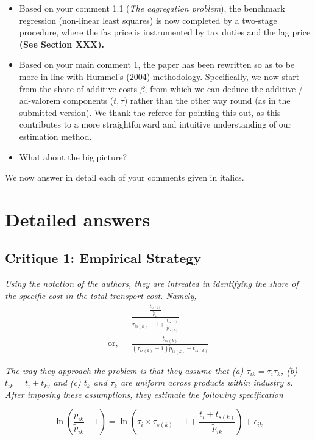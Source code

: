 \documentclass[a4paper,12pt]{article}
\begin{document}
\begin{itemize}
\item Based on your comment 1.1 (\textit{The aggregation problem}), the benchmark regression (non-linear least squares) is now completed by a two-stage procedure, where the fas price is instrumented by tax duties and the lag price \textbf{(See Section XXX).}

\item Based on your main comment 1, the paper has been rewritten so as to be more in line with Hummel's (2004) methodology. Specifically, we now start from the share of additive costs $\beta$, from which we can deduce the additive / ad-valorem components ($t,\tau$) rather than the other way round (as in the submitted version). We thank the referee for pointing this out, as this contributes to a more straightforward and intuitive understanding of our estimation method.

\item What about the big picture?
\end{itemize}

We now answer in detail each of your comments given in italics.

\section{Detailed answers \label{sec:detailed_answers}}
\subsection{Critique 1: Empirical Strategy}

\textit{Using the notation of the authors, they are intreated
in identifying the share of the specific cost in the total transport cost. Namely,}
\begin{eqnarray*}
&& \frac{\frac{t_{is(k)}}{\tilde{p}_{ik}}}{\tau_{is(k)}-1 + \frac{t_{is(k)}}{\tilde{p}_{is(k)}}} \\
\text{or,} &&\frac{t_{is(k)}}{(\tau_{is(k)}-1)\tilde{p}_{is(k)} + t_{is(k)}}
\end{eqnarray*}

\textit{The way they approach the problem is that they assume that (a) $\tau_{ik} = \tau_i\tau_{k}$,
(b) $t_{ik} = t_i +t_k$, and (c) $t_k$ and $\tau_k$ are uniform across products within industry
s. After imposing these assumptions, they estimate the following specification}

\begin{equation}
\ln\left(\frac{p_{ik}}{\widetilde{p}_{ik}}-1 \right)= \ln \left(\tau_{i} \times \tau_{s(k)} -1+\frac{t_{i} + t_{s(k)}}{\widetilde{p}_{ik}} \right) + \epsilon_{ik} \label{eq:equation0}
\end{equation}
\end{document}
